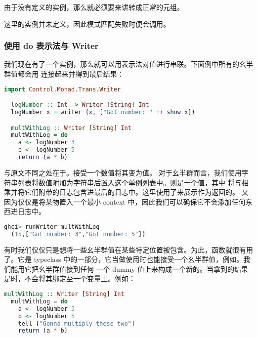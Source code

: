 \documentclass[./main.tex]{subfiles}
\begin{document}
由于没有定义的实例，那么就必须要来讲转成正常的元组。

这里的实例并未定义，因此模式匹配失败时便会调用。

\subsubsection*{使用 do 表示法与 Writer}

我们现在有了一个实例，那么就可以用表示法对值进行串联。下面例中所有的幺半群值都会用
连接起来并得到最后结果：

\begin{lstlisting}[language=Haskell]
  import Control.Monad.Trans.Writer

  logNumber :: Int -> Writer [String] Int
  logNumber x = writer (x, ["Got number: " ++ show x])

  multWithLog :: Writer [String] Int
  multWithLog = do
    a <- logNumber 3
    b <- logNumber 5
    return (a * b)
\end{lstlisting}

与原文不同之处在于。接受一个数值将其变为值。
对于幺半群而言，我们使用字符串列表将数值附加为字符串后置入这个单例列表中。则是一个值，其中
将与相乘并将它们附带的日志包含进最后的日志中。这里使用了来展示作为返回的。
又因为仅仅是将某物置入一个最小 context 中，因此我们可以确保它不会添加任何东西进日志中。

\begin{lstlisting}[language=Haskell]
  ghci> runWriter multWithLog
  (15,["Got number: 3","Got number: 5"])
\end{lstlisting}

有时我们仅仅只是想将一些幺半群值在某些特定位置被包含。为此，函数就很有用了。它是 typeclass
中的一部分，它当做使用时也能接受一个幺半群值，例如。我们能用它把幺半群值接到任何
一个 dummy 值\acode{()}上来构成一个新的。当拿到的结果是\acode{()}时，不会将其绑定至一个变量上。例如：

\begin{lstlisting}[language=Haskell]
  multWithLog :: Writer [String] Int
  multWithLog = do
    a <- logNumber 3
    b <- logNumber 5
    tell ["Gonna multiply these two"]
    return (a * b)
\end{lstlisting}
\end{document}

